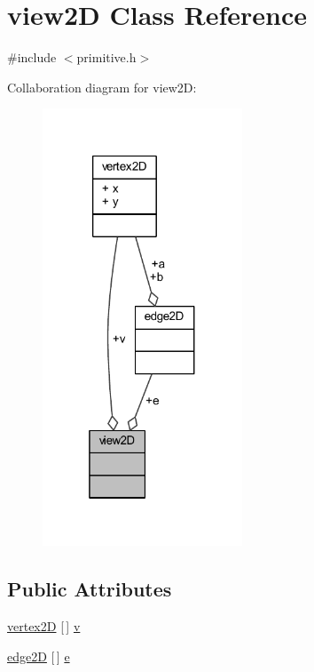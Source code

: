 \hypertarget{classview2_d}{}\section{view2D Class Reference}
\label{classview2_d}


{\ttfamily \#include $<$primitive.\+h$>$}



Collaboration diagram for view2D\+:
\nopagebreak
\begin{figure}[H]
\begin{center}
\leavevmode
\includegraphics[width=169pt]{classview2_d__coll__graph}
\end{center}
\end{figure}
\subsection*{Public Attributes}
\begin{DoxyCompactItemize}
\item 
\mbox{\hyperlink{classvertex2_d}{vertex2D}} \mbox{[}$\,$\mbox{]} \mbox{\hyperlink{classview2_d_abde5a351bf6796ae8149a3f00a783caa}{v}}
\item 
\mbox{\hyperlink{classedge2_d}{edge2D}} \mbox{[}$\,$\mbox{]} \mbox{\hyperlink{classview2_d_a3a6ad7e000ebbcf7caefe3767dfc036b}{e}}
\end{DoxyCompactItemize}


